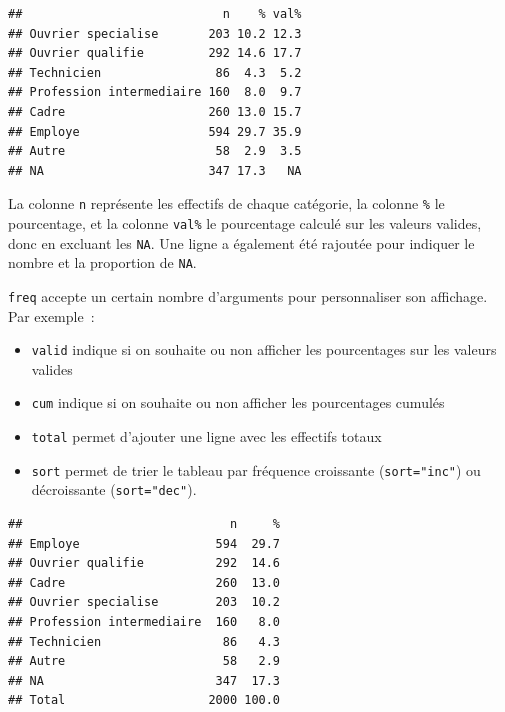 \documentclass[12pt,]{book}
\newenvironment{Shaded}{\begin{snugshade}}{\end{snugshade}}
\newcommand{\DataTypeTok}[1]{\textcolor[rgb]{0.27,0.27,0.27}{#1}}
\newcommand{\KeywordTok}[1]{\textcolor[rgb]{0.27,0.27,0.27}{\textbf{#1}}}
\newcommand{\NormalTok}[1]{#1}
\newcommand{\OperatorTok}[1]{\textcolor[rgb]{0.43,0.43,0.43}{\textbf{#1}}}
\newcommand{\OtherTok}[1]{\textcolor[rgb]{0.37,0.37,0.37}{#1}}
\newcommand{\StringTok}[1]{\textcolor[rgb]{0.5,0.5,0.5}{#1}}
\providecommand{\tightlist}{%
  \setlength{\itemsep}{0pt}\setlength{\parskip}{0pt}}
\begin{document}
\begin{verbatim}
##                            n    % val%
## Ouvrier specialise       203 10.2 12.3
## Ouvrier qualifie         292 14.6 17.7
## Technicien                86  4.3  5.2
## Profession intermediaire 160  8.0  9.7
## Cadre                    260 13.0 15.7
## Employe                  594 29.7 35.9
## Autre                     58  2.9  3.5
## NA                       347 17.3   NA
\end{verbatim}

La colonne \texttt{n} représente les effectifs de chaque catégorie, la colonne \texttt{\%} le pourcentage, et la colonne \texttt{val\%} le pourcentage calculé sur les valeurs valides, donc en excluant les \texttt{NA}. Une ligne a également été rajoutée pour indiquer le nombre et la proportion de \texttt{NA}.

\texttt{freq} accepte un certain nombre d'arguments pour personnaliser son affichage. Par exemple~:

\begin{itemize}
\tightlist
\item
  \texttt{valid} indique si on souhaite ou non afficher les pourcentages sur les valeurs valides
\item
  \texttt{cum} indique si on souhaite ou non afficher les pourcentages cumulés
\item
  \texttt{total} permet d'ajouter une ligne avec les effectifs totaux
\item
  \texttt{sort} permet de trier le tableau par fréquence croissante (\texttt{sort="inc"}) ou décroissante (\texttt{sort="dec"}).
\end{itemize}

\begin{Shaded}
\end{Shaded}

\begin{verbatim}
##                             n     %
## Employe                   594  29.7
## Ouvrier qualifie          292  14.6
## Cadre                     260  13.0
## Ouvrier specialise        203  10.2
## Profession intermediaire  160   8.0
## Technicien                 86   4.3
## Autre                      58   2.9
## NA                        347  17.3
## Total                    2000 100.0
\end{verbatim}
\end{document}
